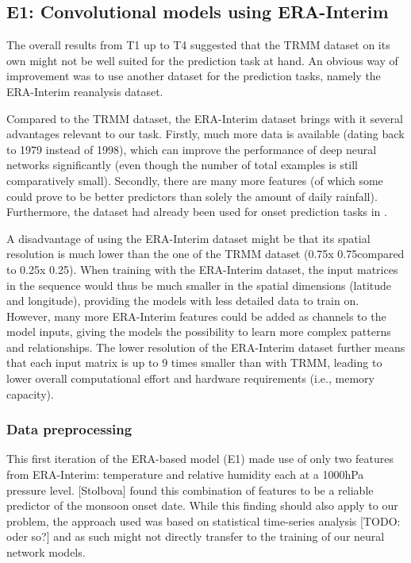 \clearpage
\subsection{E1: Convolutional models using ERA-Interim}
\label{sst:nn_e1}
The overall results from T1 up to T4 suggested that the TRMM dataset on its own might not be well suited for the prediction task at hand. An obvious way of improvement was to use another dataset for the prediction tasks, namely the ERA-Interim reanalysis dataset.

Compared to the TRMM dataset, the ERA-Interim dataset brings with it several advantages relevant to our task. Firstly, much more data is available (dating back to 1979 instead of 1998), which can improve the performance of deep neural networks significantly (even though the number of total examples is still comparatively small). Secondly, there are many more features (of which some could prove to be better predictors than solely the amount of daily rainfall). Furthermore, the dataset had already been used for onset prediction tasks in \citep{Stolbova.2015}.

A disadvantage of using the ERA-Interim dataset might be that its spatial resolution is much lower than the one of the TRMM dataset (0.75\degree x 0.75\degree compared to 0.25\degree x 0.25\degree). When training with the ERA-Interim dataset, the input matrices in the sequence would thus be much smaller in the spatial dimensions (latitude and longitude), providing the models with less detailed data to train on. However, many more ERA-Interim features could be added as channels to the model inputs, giving the models the possibility to learn more complex patterns and relationships. The lower resolution of the ERA-Interim dataset further means that each input matrix is up to 9 times smaller than with TRMM, leading to lower overall computational effort and hardware requirements (i.e., memory capacity).

\subsubsection{Data preprocessing}
\label{ssst:nn_e1_data}
This first iteration of the ERA-based model (E1) made use of only two features from ERA-Interim: temperature and relative humidity each at a 1000hPa pressure level. [Stolbova] found this combination of features to be a reliable predictor of the monsoon onset date. While this finding should also apply to our problem, the approach used was based on statistical time-series analysis [TODO: oder so?] and as such might not directly transfer to the training of our neural network models.

